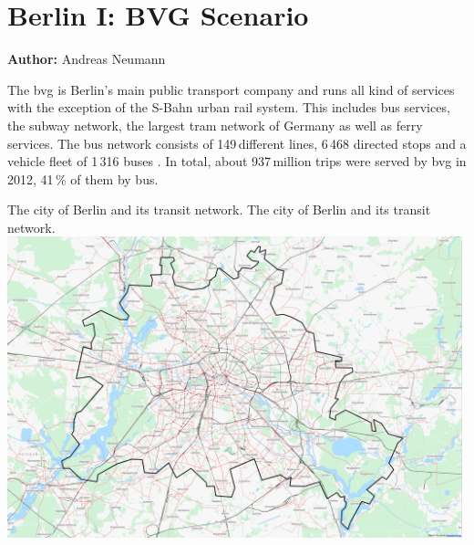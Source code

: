 \section{Berlin I: BVG Scenario}
\label{sec:berlinI}
\hfill \textbf{Author:} Andreas Neumann

The \gls{bvg} is Berlin's main public transport company and runs all kind of services with the exception of the S-Bahn urban rail system. This includes bus services, the subway network, the largest tram network of Germany as well as ferry services. The bus network consists of 149\,different lines, 6\,468 directed stops and a vehicle fleet of 1\,316 buses \citep{BVG2012}. In total, about 937\,million trips were served by \gls{bvg} in 2012, 41\,\% of them by bus.

\createfigure%
{The city of Berlin and its transit network.}%
{The city of Berlin and its transit network.}%
{\label{fig:scenario_berlin_i}}%
{\includegraphics[width=0.99\textwidth, angle=0]{using/figures/berlin_pt}}%
{}

